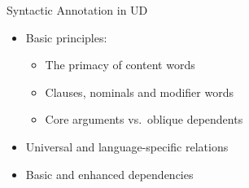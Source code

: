 \documentclass[10pt, compress, aspectratio=169]{beamer}
\begin{document}






\begin{frame}{Syntactic Annotation in UD}
\begin{itemize}
\item  Basic principles:
\begin{itemize}
\item  The primacy of content words
\item  Clauses, nominals and modifier words
\item  Core arguments vs.\ oblique dependents
\end{itemize}
\item  Universal and language-specific relations
\item  Basic and enhanced dependencies
\end{itemize}
\end{frame}
\end{document}
